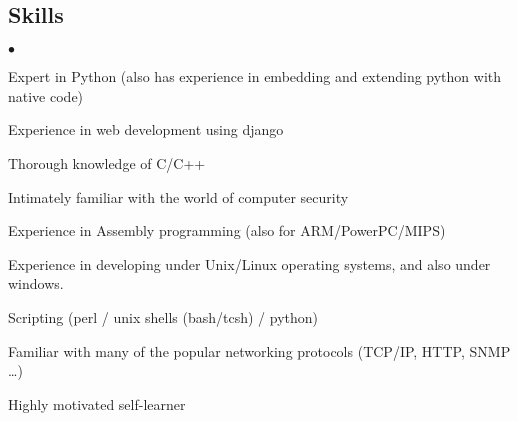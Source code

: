 \documentclass[margin,line]{res}
\newenvironment{list2}{
  \begin{list}{$\bullet$}{%
      \setlength{\itemsep}{0in}
      \setlength{\parsep}{0in} \setlength{\parskip}{0in}
      \setlength{\topsep}{0in} \setlength{\partopsep}{0in} 
      \setlength{\leftmargin}{0.2in}}}{\end{list}}
\begin{document}
\begin{resume}
\section{\sc Skills} 
\begin{list2}
\item Expert in Python (also has experience in embedding and extending python with native code)
\item Experience in web development using django
\item Thorough knowledge of C/C++
\item Intimately familiar with the world of computer security
\item Experience in Assembly programming (also for ARM/PowerPC/MIPS)
\item Experience in developing under Unix/Linux operating systems, and also under windows.
\item Scripting (perl / unix shells (bash/tcsh) / python)
\item Familiar with many of the popular networking protocols (TCP/IP, HTTP, SNMP \ldots)
\item Highly motivated self-learner
\end{list2}

\end{resume}
\end{document}
